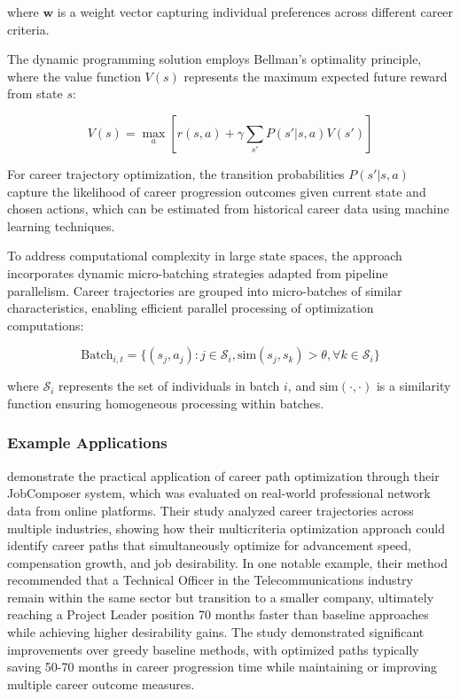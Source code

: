 \documentclass[main.tex]{subfiles}
\begin{document}
where \( \mathbf{w} \) is a weight vector capturing individual preferences across different career criteria\parencite{jobcomposer}.

The dynamic programming solution employs Bellman's optimality principle, where the value function \( V(s) \) represents the maximum expected future reward from state \( s \):

\[
V(s) = \max_a \left[r(s,a) + \gamma \sum_{s'} P(s'|s,a) V(s')\right]
\]

For career trajectory optimization, the transition probabilities \( P(s'|s,a) \) capture the likelihood of career progression outcomes given current state and chosen actions, which can be estimated from historical career data using machine learning techniques\parencite{career_optimization,dynapipe_eurosys}.

To address computational complexity in large state spaces, the approach incorporates dynamic micro-batching strategies adapted from pipeline parallelism\parencite{dynapipe_eurosys}. Career trajectories are grouped into micro-batches of similar characteristics, enabling efficient parallel processing of optimization computations:

\[
\text{Batch}_{i,t} = \{(s_j, a_j) : j \in \mathcal{S}_i, \text{sim}(s_j, s_k) > \theta, \forall k \in \mathcal{S}_i\}
\]

where \( \mathcal{S}_i \) represents the set of individuals in batch \( i \), and \( \text{sim}(\cdot, \cdot) \) is a similarity function ensuring homogeneous processing within batches\parencite{dynapipe_eurosys}.

\subsubsection{Example Applications}

\textcite{jobcomposer} demonstrate the practical application of career path optimization through their JobComposer system, which was evaluated on real-world professional network data from online platforms. Their study analyzed career trajectories across multiple industries, showing how their multicriteria optimization approach could identify career paths that simultaneously optimize for advancement speed, compensation growth, and job desirability. In one notable example, their method recommended that a Technical Officer in the Telecommunications industry remain within the same sector but transition to a smaller company, ultimately reaching a Project Leader position 70 months faster than baseline approaches while achieving higher desirability gains. The study demonstrated significant improvements over greedy baseline methods, with optimized paths typically saving 50-70 months in career progression time while maintaining or improving multiple career outcome measures.
\end{document}
